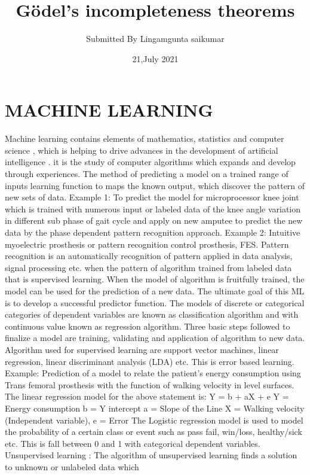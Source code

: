 \documentclass{article}
\title{Gödel's incompleteness theorems}
\author{Submitted By Lingamgunta saikumar}
\date{21,July 2021}
\begin{document}
\maketitle

\section{MACHINE LEARNING }
Machine learning contains elements of mathematics, statistics and computer science , 
which is helping to drive advances in the development of artificial intelligence . it is the 
study of computer algorithms which expands and develop through experiences.
The method of predicting a model on a trained range of inputs learning function to maps 
the known output, which discover the pattern of new sets of data.
Example 1: To predict the model for microprocessor knee joint which is trained with 
numerous input or labeled data of the knee angle variation in different sub phase of gait 
cycle and apply on new amputee to predict the new data by the phase dependent pattern 
recognition approach.
Example 2: Intuitive myoelectric prosthesis or pattern recognition control prosthesis, FES.
Pattern recognition is an automatically recognition of pattern applied in data analysis, signal 
processing etc. when the pattern of algorithm trained from labeled data that is supervised 
learning. When the model of algorithm is fruitfully trained, the model can be used for the 
prediction of a new data. The ultimate goal of this ML is to develop a successful predictor 
function. The models of discrete or categorical categories of dependent variables are known 
as classification algorithm and with continuous value known as regression algorithm. Three 
basic steps followed to finalize a model are training, validating and application of algorithm 
to new data. Algorithm used for supervised learning are support vector machines, linear 
regression, linear discriminant analysis (LDA) etc. This is error based learning.
Example: Prediction of a model to relate the patient’s energy consumption using Trans 
femoral prosthesis with the function of walking velocity in level surfaces.
The linear regression model for the above statement is:
Y = b + aX + e 
Y = Energy consumption 
b = Y intercept 
a = Slope of the Line
X = Walking velocity (Independent variable), e = Error
The Logistic regression model is used to model the probability of a certain class or event 
such as pass fail, win/loss, healthy/sick etc. This is fall between 0 and 1 with categorical 
dependent variables.
Unsupervised learning :
The algorithm of unsupervised learning finds a solution to unknown or unlabeled data which 
\end{document}
